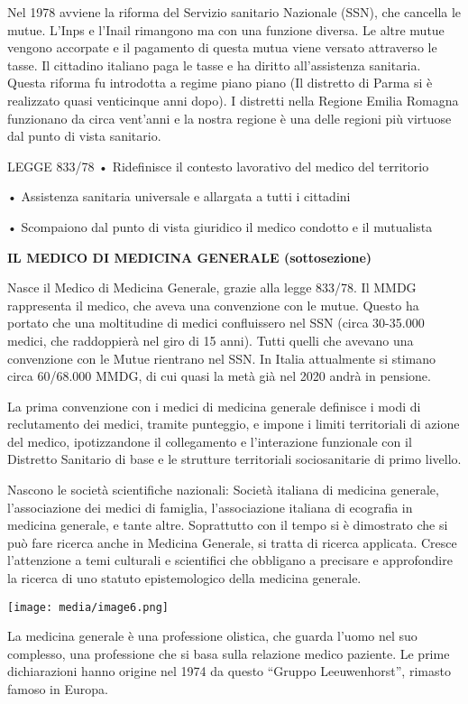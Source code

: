 \documentclass[]{article}
\begin{document}
Nel 1978 avviene la riforma del Servizio sanitario Nazionale (SSN), che
cancella le mutue. L'Inps e l'Inail rimangono ma con una funzione
diversa. Le altre mutue vengono accorpate e il pagamento di questa mutua
viene versato attraverso le tasse. Il cittadino italiano paga le tasse e
ha diritto all'assistenza sanitaria. Questa riforma fu introdotta a
regime piano piano (Il distretto di Parma si è realizzato quasi
venticinque anni dopo). I distretti nella Regione Emilia Romagna
funzionano da circa vent'anni e la nostra regione è una delle regioni
più virtuose dal punto di vista sanitario.

LEGGE 833/78 • Ridefinisce il contesto lavorativo del medico del
territorio

• Assistenza sanitaria universale e allargata a tutti i cittadini

• Scompaiono dal punto di vista giuridico il medico condotto e il
mutualista

\textbf{IL MEDICO DI MEDICINA GENERALE (sottosezione)}

Nasce il Medico di Medicina Generale, grazie alla legge 833/78. Il MMDG
rappresenta il medico, che aveva una convenzione con le mutue. Questo ha
portato che una moltitudine di medici confluissero nel SSN (circa
30-35.000 medici, che raddoppierà nel giro di 15 anni). Tutti quelli che
avevano una convenzione con le Mutue rientrano nel SSN. In Italia
attualmente si stimano circa 60/68.000 MMDG, di cui quasi la metà già
nel 2020 andrà in pensione.

La prima convenzione con i medici di medicina generale definisce i modi
di reclutamento dei medici, tramite punteggio, e impone i limiti
territoriali di azione del medico, ipotizzandone il collegamento e
l'interazione funzionale con il Distretto Sanitario di base e le
strutture territoriali sociosanitarie di primo livello.

Nascono le società scientifiche nazionali: Società italiana di medicina
generale, l'associazione dei medici di famiglia, l'associazione italiana
di ecografia in medicina generale, e tante altre. Soprattutto con il
tempo si è dimostrato che si può fare ricerca anche in Medicina
Generale, si tratta di ricerca applicata. Cresce l'attenzione a temi
culturali e scientifici che obbligano a precisare e approfondire la
ricerca di uno statuto epistemologico della medicina generale.

\texttt{[image: media/image6.png]}

La medicina generale è una professione olistica, che guarda l'uomo nel
suo complesso, una professione che si basa sulla relazione medico
paziente. Le prime dichiarazioni hanno origine nel 1974 da questo
``Gruppo Leeuwenhorst'', rimasto famoso in Europa.
\end{document}
